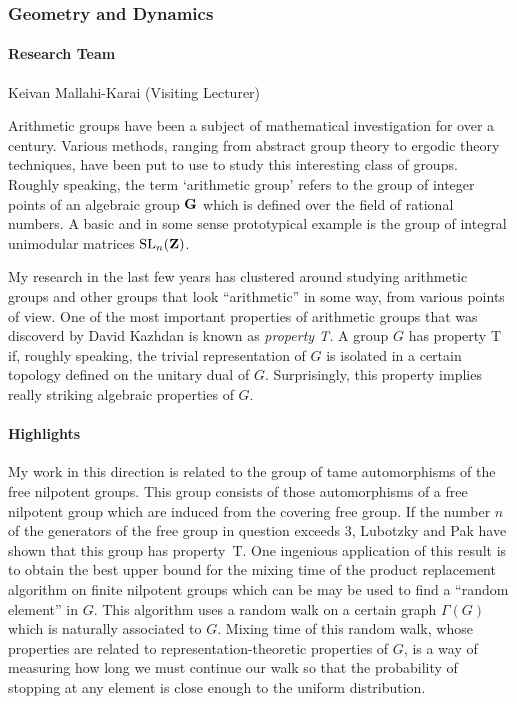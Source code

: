 
 
\subsubsection{Geometry and Dynamics }

\paragraph{Research Team}
Keivan Mallahi-Karai (Visiting Lecturer)

\medskip
 
Arithmetic groups have been a subject of mathematical investigation for over a
century. Various methods, ranging from abstract group theory to ergodic theory
techniques, have been put to use to study this interesting class of groups.
Roughly speaking, the term `arithmetic group' refers to the group of integer
points of an algebraic group ${\bf G}$ which is defined over the field of
rational numbers. A basic and in some sense prototypical example is the group
of integral unimodular matrices ${\rm SL}_n({\bf Z})$.   

My research in the last few years has clustered around studying arithmetic
groups and other groups that look ``arithmetic'' in some way, from various
points of view. One of the  most important properties of arithmetic groups that
was discoverd by David Kazhdan is  known as {\sl property T.} A group $G$ has
property T if, roughly speaking, the trivial representation of $G$ is isolated
in a certain topology defined on the unitary  dual of $G$. Surprisingly, this
property implies really striking algebraic properties  of $G$.

 
\paragraph{Highlights}

My work in this direction is related to the group of tame automorphisms of the
free nilpotent groups. This group consists of those automorphisms of a free
nilpotent group which are induced from the covering free group. If the number
$n$ of the generators of the free group in question exceeds $3$, Lubotzky and
Pak have shown that this group has property~T. One ingenious application of
this result is to obtain the best upper bound for the mixing time of the
product replacement algorithm on finite nilpotent groups which can be may be
used to find a ``random element'' in $G$. This algorithm uses a random walk on
a certain graph $\Gamma (G)$ which is naturally associated to $G$. Mixing time
of this random walk, whose properties are related to representation-theoretic
properties of $G$, is a way of measuring how long we must continue our walk so
that the probability of stopping at any element is close enough to the uniform
distribution.  

